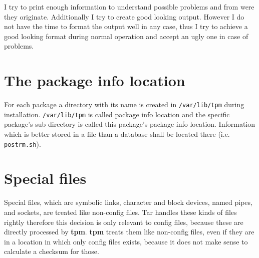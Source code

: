\documentclass[a4paper]{article}
\newcommand{\file}[1]{\texttt{#1}}
\newcommand{\program}[1]{\textbf{#1}}
\begin{document}
	I try to print enough information to understand possible problems and from were they originate. Additionally I try to create good looking output. However I do not have the time to format the output well in any case, thus I try to achieve a good looking format during normal operation and accept an ugly one in case of problems.
	
	\section{The package info location}
	\label{sec:the_package_info_location}
	
	For each package a directory with its name is created in \file{/var/lib/tpm} during installation. \file{/var/lib/tpm} is called package info location and the specific package's sub directory is called this package's package info location. Information which is better stored in a file than a database shall be located there (i.e. \file{postrm.sh}).
	
	\section{Special files}
	\label{sec:special_files}
	
	Special files, which are symbolic links, character and block devices, named pipes, and sockets, are treated like non-config files. Tar handles these kinds of files rightly therefore this decision is only relevant to config files, because these are directly processed by \program{tpm}. \program{tpm} treats them like non-config files, even if they are in a location in which only config files exists, because it does not make sense to calculate a checksum for those.
\end{document}
